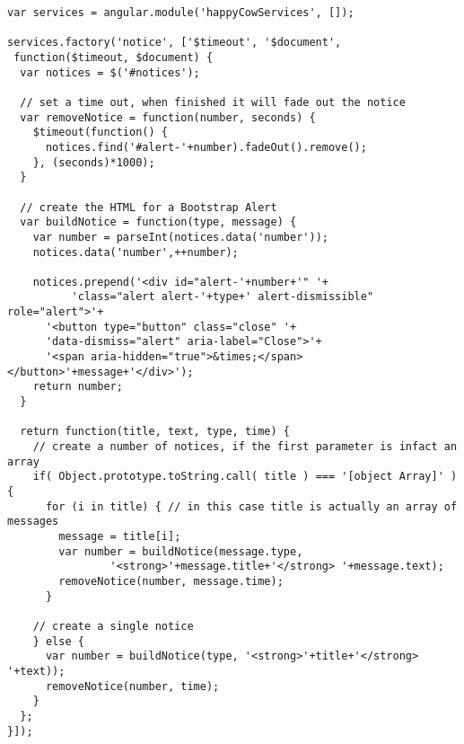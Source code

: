 \begin{verbatim}
var services = angular.module('happyCowServices', []);

services.factory('notice', ['$timeout', '$document', 
 function($timeout, $document) {
  var notices = $('#notices');

  // set a time out, when finished it will fade out the notice
  var removeNotice = function(number, seconds) {
    $timeout(function() {
      notices.find('#alert-'+number).fadeOut().remove();
    }, (seconds)*1000);
  }

  // create the HTML for a Bootstrap Alert
  var buildNotice = function(type, message) {
    var number = parseInt(notices.data('number'));
    notices.data('number',++number);

    notices.prepend('<div id="alert-'+number+'" '+
    	  'class="alert alert-'+type+' alert-dismissible" role="alert">'+
      '<button type="button" class="close" '+
      'data-dismiss="alert" aria-label="Close">'+
      '<span aria-hidden="true">&times;</span></button>'+message+'</div>');
    return number;
  }

  return function(title, text, type, time) {
    // create a number of notices, if the first parameter is infact an array
    if( Object.prototype.toString.call( title ) === '[object Array]' ) {
      for (i in title) { // in this case title is actually an array of messages
        message = title[i];
        var number = buildNotice(message.type, 
        		'<strong>'+message.title+'</strong> '+message.text);
        removeNotice(number, message.time);
      }

    // create a single notice
    } else {
      var number = buildNotice(type, '<strong>'+title+'</strong> '+text));
      removeNotice(number, time);
    }
  };
}]);
\end{verbatim}